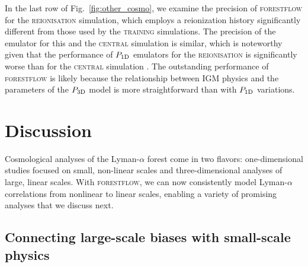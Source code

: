 \documentclass{aa}
\newcommand{\lya}{Lyman-$\alpha$\xspace}
\newcommand{\poned}{\ensuremath{P_{\rm 1D}}\xspace}
\newcommand{\pthreed}{\ensuremath{P_{\rm 3D}}\xspace}
\newcommand{\forestflow}{\textsc{forestflow}\xspace}
\newcommand{\lacehc}{\textsc{training}\xspace}
\newcommand{\simigm}{\textsc{reionisation}\xspace}
\newcommand{\simcentral}{\textsc{central}\xspace}
\begin{document}
In the last row of Fig.~\ref{fig:other_cosmo}, we examine the precision of \forestflow for the \simigm simulation, which employs a  reionization history significantly different from those used by the \lacehc simulations. The precision of the emulator for this and the \simcentral simulation is similar, which is noteworthy given that the performance of \poned emulators for the \simigm is significantly worse than for the \simcentral simulation \citep{cabayol-garcia2023NeuralNetworkEmulator}. The outstanding performance of \forestflow is likely because the relationship between IGM physics and the parameters of the \pthreed model is more straightforward than with \poned variations.



\section{Discussion}
\label{sec:discussion}

Cosmological analyses of the \lya forest come in two flavors: one-dimensional studies focused on small, non-linear scales and three-dimensional analyses of large, linear scales. With \forestflow, we can now consistently model \lya correlations from nonlinear to linear scales, enabling a variety of promising analyses that we discuss next.


\subsection{Connecting large-scale biases with small-scale physics}
\label{sec:discussion_large_small}
\end{document}
